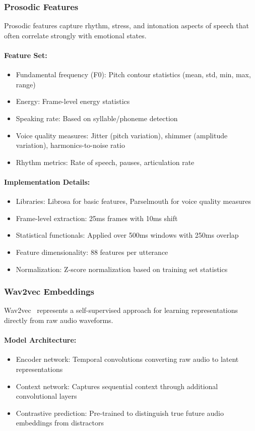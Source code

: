 \documentclass[12pt]{article}
\begin{document}
\subsubsection{Prosodic Features}
Prosodic features capture rhythm, stress, and intonation aspects of speech that often correlate strongly with emotional states.

\paragraph{Feature Set:}
\begin{itemize}
    \item Fundamental frequency (F0): Pitch contour statistics (mean, std, min, max, range)
    \item Energy: Frame-level energy statistics
    \item Speaking rate: Based on syllable/phoneme detection
    \item Voice quality measures: Jitter (pitch variation), shimmer (amplitude variation), harmonics-to-noise ratio
    \item Rhythm metrics: Rate of speech, pauses, articulation rate
\end{itemize}

\paragraph{Implementation Details:}
\begin{itemize}
    \item Libraries: Librosa for basic features, Parselmouth for voice quality measures
    \item Frame-level extraction: 25ms frames with 10ms shift
    \item Statistical functionals: Applied over 500ms windows with 250ms overlap
    \item Feature dimensionality: 88 features per utterance
    \item Normalization: Z-score normalization based on training set statistics
\end{itemize}

\subsubsection{Wav2vec Embeddings}
Wav2vec~\cite{schneider2019wav2vec} represents a self-supervised approach for learning representations directly from raw audio waveforms.

\paragraph{Model Architecture:}
\begin{itemize}
    \item Encoder network: Temporal convolutions converting raw audio to latent representations
    \item Context network: Captures sequential context through additional convolutional layers
    \item Contrastive prediction: Pre-trained to distinguish true future audio embeddings from distractors
\end{itemize}
\end{document}
